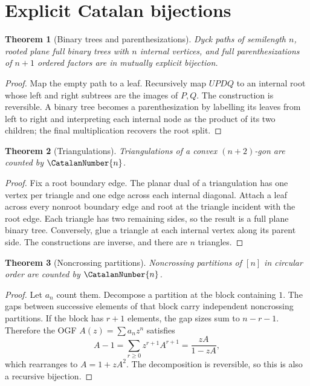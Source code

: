 \documentclass[11pt,a4paper,oneside,openany]{book}
\newtheorem{theorem}{Theorem}[chapter]
\theoremstyle{definition}
\theoremstyle{remark}
\begin{document}
\section{Explicit Catalan bijections}

\begin{theorem}[Binary trees and parenthesizations]
\label{thm:merged-catalan-bijection}
Dyck paths of semilength $n$, rooted plane full binary trees with $n$ internal
vertices, and full parenthesizations of $n+1$ ordered factors are in mutually
explicit bijection.
\end{theorem}

\begin{proof}
Map the empty path to a leaf.  Recursively map $UPDQ$ to an internal root whose
left and right subtrees are the images of $P,Q$.  The construction is
reversible.  A binary tree becomes a parenthesization by labelling its leaves
from left to right and interpreting each internal node as the product of its
two children; the final multiplication recovers the root split.
\end{proof}

\begin{theorem}[Triangulations]
\label{thm:merged-triangulations}
Triangulations of a convex $(n+2)$-gon are counted by $\CatalanNumber{n}$.
\end{theorem}

\begin{proof}
Fix a root boundary edge.  The planar dual of a triangulation has one vertex
per triangle and one edge across each internal diagonal.  Attach a leaf across
every nonroot boundary edge and root at the triangle incident with the root
edge.  Each triangle has two remaining sides, so the result is a full plane
binary tree.  Conversely, glue a triangle at each internal vertex along its
parent side.  The constructions are inverse, and there are $n$ triangles.
\end{proof}

\begin{theorem}[Noncrossing partitions]
\label{thm:merged-noncrossing}
Noncrossing partitions of $[n]$ in circular order are counted by $\CatalanNumber{n}$.
\end{theorem}

\begin{proof}
Let $a_n$ count them.  Decompose a partition at the block containing $1$.
The gaps between successive elements of that block carry independent
noncrossing partitions.  If the block has $r+1$ elements, the gap sizes sum to
$n-r-1$.  Therefore the OGF $A(z)=\sum a_nz^n$ satisfies
\[
 A-1=\sum_{r\geq0}z^{r+1}A^{r+1}=\frac{zA}{1-zA},
\]
which rearranges to $A=1+zA^2$.  The decomposition is reversible, so this is
also a recursive bijection.
\end{proof}
\end{document}

